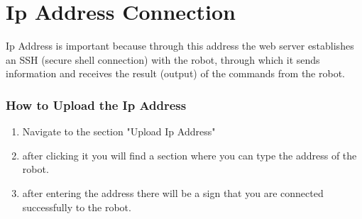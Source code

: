 %
%

\chapter{Ip Address Connection}

Ip Address is important because through this address the web server establishes an SSH (secure shell connection) with the robot, through which it sends information and receives the result (output) of the commands from the robot.
\subsection{How to Upload the Ip Address}
\begin{enumerate}
	\item Navigate to the section "Upload Ip Address"
	\item after clicking it you will find a section where you can type the address of the robot.
	\item after entering the address there will be a sign that you are connected successfully to the robot.
\end{enumerate}
